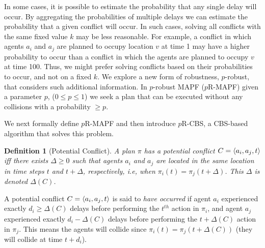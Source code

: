 \documentclass{article}
\newcommand{\prcbs}{$p$R-CBS\xspace}
\newcommand{\prmapf}{$p$R-MAPF\xspace}
\newtheorem{definition}{Definition}
\begin{document}
In some cases, it is possible to estimate the probability that any single delay will occur.  By aggregating the probabilities of multiple delays we can estimate the probability that a given conflict will occur. In such cases, solving all conflicts with the same fixed value $k$ may be less reasonable. For example, a conflict in which agents $a_i$ and $a_j$ are planned to occupy location $v$ at time 1  may have a higher probability to occur than a  conflict in which the agents are planned to occupy $v$ at time 100. Thus, we might prefer solving conflicts based on their probabilities to occur, and not on a fixed $k$. We explore a new form of robustness, $p$-robust, that considers such additional information. In $p$-robust MAPF (\prmapf) given a parameter $p$, ($0 \leq p \leq 1$) we seek a plan that can be executed without any collisions with a probability $\geq p$. 

We next formally define \prmapf{} and then introduce \prcbs, a CBS-based algorithm that solves this problem. 


\begin{definition}[Potential Conflict]
A plan $\pi$ has a potential conflict $C=\left \langle a_i,a_j,t \right \rangle $ iff there exists $\Delta\geq 0$ such that agents $a_i$ and $a_j$ are located in the same location in time steps $t$ and $t+\Delta$, respectively, i.e, when $\pi_i(t) = \pi_j(t+\Delta)$. 
This $\Delta$ is denoted $\Delta(C)$.  
\end{definition}


A potential conflict $C=\left \langle a_i,a_j,t \right \rangle $ 
is said to {\em have occurred} if 
agent $a_i$ experienced exactly $d_i\geq \Delta(C)$ delays 
before performing the $t^{th}$ action in $\pi_i$, 
and agent $a_j$ experienced exactly $d_i-\Delta(C)$ delays before performing the $t+\Delta(C)$ action in $\pi_j$. This means the agents will collide  since $\pi_i(t)=\pi_j(t+\Delta(C))$ (they will collide at time $t+d_i$).
 
\end{document}
